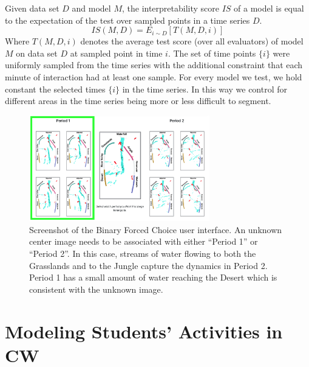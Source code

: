 \documentclass[letterpaper]{article} %
\begin{document}
Given data set $D$ and model $M$, the interpretability score $IS$ of a model is equal to the expectation   of the test over sampled points in a time series $D$.
\begin{equation}
    \label{eq:interpretability_score_eq}
     IS(M,D) = E_{i\sim D} [ T (M,D,i)]
\end{equation}
Where $T(M,D,i)$  denotes the average test score (over all evaluators) of model $M$ on data set $D$ at sampled point in time $i$. The set of time points $\{i\}$ were uniformly sampled from the time series with the additional constraint that each minute of interaction had at least one sample.
For every model we test, we hold constant the selected times $\{i\}$ in the time series. In this way we  control for different areas in the time series being more or less difficult to segment.




\begin{figure}[t]
\centering
\includegraphics[width=0.70\textwidth]{images/test2_screenshot}
\caption{Screenshot of the  Binary Forced Choice  user interface. An unknown center image needs to be associated with either ``Period 1'' or ``Period 2''. In this case, streams of water flowing to both the Grasslands and to the Jungle capture the dynamics in Period 2. Period 1 has a small amount of water reaching the Desert which is consistent with the unknown image.}
\label{fig:test2_screenshot}
\end{figure}



















\section{Modeling Students' Activities in CW}
\label{sec:model_for_segmenting_time}
\end{document}
